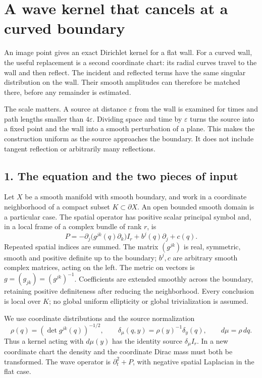 \documentclass[
  11pt,
]{article}
\author{}
\date{}
\begin{document}
\section{A wave kernel that cancels at a curved
boundary}\label{a-wave-kernel-that-cancels-at-a-curved-boundary}

An image point gives an exact Dirichlet kernel for a flat wall. For a
curved wall, the useful replacement is a second coordinate chart: its
radial curves travel to the wall and then reflect. The incident and
reflected terms have the same singular distribution on the wall. Their
smooth amplitudes can therefore be matched there, before any remainder
is estimated.

The scale matters. A source at distance \(\varepsilon\) from the wall is
examined for times and path lengths smaller than \(4\varepsilon\).
Dividing space and time by \(\varepsilon\) turns the source into a fixed
point and the wall into a smooth perturbation of a plane. This makes the
construction uniform as the source approaches the boundary. It does not
include tangent reflection or arbitrarily many reflections.

\subsection{1. The equation and the two pieces of
input}\label{the-equation-and-the-two-pieces-of-input}

Let \(X\) be a smooth manifold with smooth boundary, and work in a
coordinate neighborhood of a compact subset \(K\subset\partial X\). An
open bounded smooth domain is a particular case. The spatial operator
has positive scalar principal symbol and, in a local frame of a complex
bundle of rank \(r\), is \[
 P=-\partial_j\bigl(g^{jk}(q)\partial_k\bigr)I_r
       +b^j(q)\partial_j+c(q).                         \tag{R1}
\] Repeated spatial indices are summed. The matrix \((g^{jk})\) is real,
symmetric, smooth and positive definite up to the boundary; \(b^j,c\)
are arbitrary smooth complex matrices, acting on the left. The metric on
vectors is \(g=(g_{jk})=(g^{jk})^{-1}\). Coefficients are extended
smoothly across the boundary, retaining positive definiteness after
reducing the neighborhood. Every conclusion is local over \(K\); no
global uniform ellipticity or global trivialization is assumed.

We use coordinate distributions and the source normalization \[
 \rho(q)=(\det g^{jk}(q))^{-1/2},\qquad
 \delta_\mu(q,y)=\rho(y)^{-1}\delta_y(q),\qquad d\mu=\rho\,dq.
                                                               \tag{R2}
\] Thus a kernel acting with \(d\mu(y)\) has the identity source
\(\delta_\mu I_r\). In a new coordinate chart the density and the
coordinate Dirac mass must both be transformed. The wave operator is
\(\partial_t^2+P\), with negative spatial Laplacian in the flat case.
\end{document}

